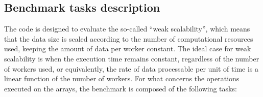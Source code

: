 \subsection{Benchmark tasks description}\label{subsec:benchmarktasks}

The code is designed to evaluate the so-called ``weak scalability'', which means
that the data size is scaled according to the number of computational resources
used, keeping the amount of data per worker constant. The ideal case for weak
scalability is when the execution time remains constant, regardless of the
number of workers used, or equivalently, the rate of data processable per unit
of time is a linear function of the number of workers. For what concerns the
operations executed on the arrays, the benchmark is composed of the following
tasks:

